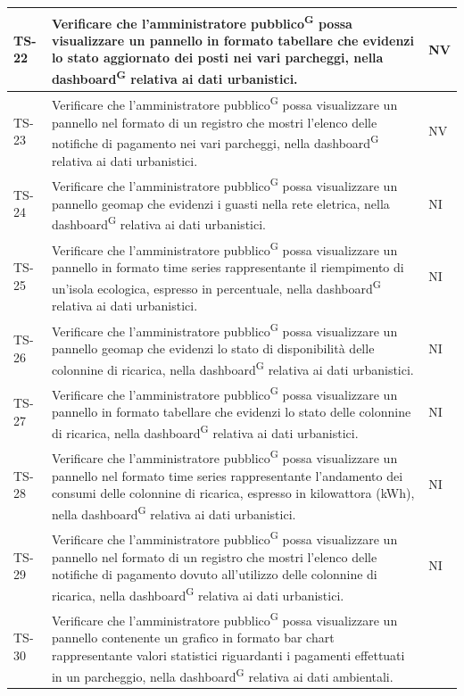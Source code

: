 \documentclass[8pt]{article}
\newcommand{\glossterm}[1]{#1\textsuperscript{G}} %
\begin{document}
\begin{longtable}{|>{\centering}p{2cm}|>{\RaggedRight}m{12cm}|>{\centering\arraybackslash}p{2cm}|}
    \hline
    TS-22 & Verificare che l’\glossterm{amministratore pubblico} possa visualizzare un pannello in formato tabellare che evidenzi lo stato aggiornato dei posti nei vari parcheggi, nella
    \glossterm{dashboard} relativa ai dati urbanistici. & NV \\
    \hline
    TS-23 & 
    Verificare che l’\glossterm{amministratore pubblico} possa visualizzare un pannello nel formato di un registro che mostri l'elenco delle notifiche di pagamento nei vari parcheggi, nella \glossterm{dashboard} relativa ai dati urbanistici.& NV \\
    \hline
    TS-24 & 
    Verificare che l’\glossterm{amministratore pubblico} possa visualizzare un pannello geomap che evidenzi i guasti nella rete eletrica, nella \glossterm{dashboard} relativa ai dati urbanistici.& NI \\
    \hline
    TS-25 & 
    Verificare che l’\glossterm{amministratore pubblico} possa visualizzare un pannello in formato time series rappresentante il riempimento di un'isola ecologica, espresso in percentuale, nella \glossterm{dashboard} relativa ai dati urbanistici.& NI \\
    \hline
    TS-26 & 
    Verificare che l’\glossterm{amministratore pubblico} possa visualizzare un pannello geomap che evidenzi lo stato di disponibilità delle colonnine di ricarica, nella \glossterm{dashboard} relativa ai dati urbanistici.& NI \\
    \hline
    TS-27 & 
    Verificare che l’\glossterm{amministratore pubblico} possa visualizzare un pannello in formato tabellare che evidenzi lo stato delle colonnine di ricarica, nella \glossterm{dashboard} relativa ai dati urbanistici.& NI \\
    \hline
    TS-28 & 
    Verificare che l’\glossterm{amministratore pubblico} possa visualizzare un pannello nel formato time series rappresentante l'andamento dei consumi delle colonnine di ricarica, espresso in kilowattora (kWh), nella \glossterm{dashboard} relativa ai dati urbanistici.& NI \\
    \hline
    TS-29 & 
    Verificare che l’\glossterm{amministratore pubblico} possa visualizzare un pannello nel formato di un registro che mostri l'elenco delle notifiche di pagamento dovuto all'utilizzo delle colonnine di ricarica, nella \glossterm{dashboard} relativa ai dati urbanistici.& NI \\
    \hline
    TS-30 & Verificare che l’\glossterm{amministratore pubblico} possa visualizzare un pannello contenente
    un grafico in formato bar chart rappresentante valori statistici riguardanti i pagamenti effettuati in un parcheggio, nella \glossterm{dashboard} relativa ai dati ambientali.

\end{longtable}
\end{document}
